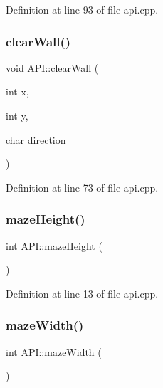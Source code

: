 Definition at line 93 of file api.\+cpp.

\mbox{\label{class_a_p_i_a3178d408a832d81500847ca62ce1f509}} 
\subsubsection{\texorpdfstring{clear\+Wall()}{clearWall()}}
{\footnotesize\ttfamily void A\+P\+I\+::clear\+Wall (\begin{DoxyParamCaption}\item[{int}]{x,  }\item[{int}]{y,  }\item[{char}]{direction }\end{DoxyParamCaption})\hspace{0.3cm}{\ttfamily [static]}}



Definition at line 73 of file api.\+cpp.

\mbox{\label{class_a_p_i_ae356a8b8b3090ec8e5e66fb9d7e827a6}} 
\subsubsection{\texorpdfstring{maze\+Height()}{mazeHeight()}}
{\footnotesize\ttfamily int A\+P\+I\+::maze\+Height (\begin{DoxyParamCaption}{ }\end{DoxyParamCaption})\hspace{0.3cm}{\ttfamily [static]}}



Definition at line 13 of file api.\+cpp.

\mbox{\label{class_a_p_i_aad4f60e45d012af3985946b3a3bd561c}} 
\subsubsection{\texorpdfstring{maze\+Width()}{mazeWidth()}}
{\footnotesize\ttfamily int A\+P\+I\+::maze\+Width (\begin{DoxyParamCaption}{ }\end{DoxyParamCaption})\hspace{0.3cm}{\ttfamily [static]}}



